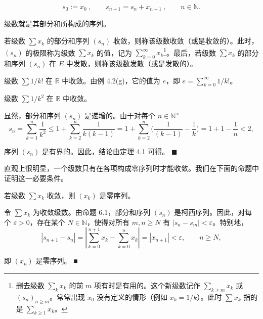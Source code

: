 \[
s_{0}:=x_{0}~,\qquad s_{n+1}=s_{n}+x_{n+1}~,\qquad n\in\mathbb{N}.
\]

级数就是其部分和所构成的序列。

若级数 $ \sum x_k $ 的部分和序列 $ (s_n) $ 收敛，则称该级数收敛（或是收敛的）。此时，$ (s_n) $ 的极限称为级数 $ \sum x_k $ 的值，记为 $ \sum_{k=0}^{\infty} x_k $\footnote{删去级数 $\sum_k x_k$ 的前 $m$ 项有时是有用的。这个新级数记作 $\sum_{k\geq m} x_k$ 或 $(s_n)_{n\geq m}$。常常出现 $x_0$ 没有定义的情形（例如 $x_k=1/k$）。此时 $\sum x_k$ 指的是 $\sum_{k\geq 1} x_k$。}。最后，若级数 $ \sum x_k $ 的部分和序列 $ (s_n) $ 在 $ E $ 中发散，则称该级数发散（或是发散的）。

\begin{example}

\begin{items}
\item

级数 $ \sum 1/k! $ 在 $ \mathbb{R} $ 中收敛。由例 4.2(g)，它的值为 $ e $，即 $ e = \sum_{k=0}^{\infty} 1/k! $。

\item

级数 $ \sum 1/k^2 $ 在 $ \mathbb{R} $ 中收敛。

\proofhead
显然，部分和序列 $ (s_n) $ 是递增的。由于对每个 $ n \in \mathbb{N}^\times $
\[
s_{n}=\sum_{k=1}^{n}\frac{1}{k^{2}}\leq1+\sum_{k=2}^{n}\frac{1}{k(k-1)}=1+\sum_{k=2}^{n}\Big(\frac{1}{(k-1)}-\frac{1}{k}\Big)=1+1-\frac{1}{n}<2,
\]

序列 $ (s_{n}) $ 是有界的。因此，结论由定理 4.1 可得。 $ \blacksquare $

\end{items}

直观上很明显，一个级数只有在各项构成零序列时才能收敛。我们在下面的命题中证明这一必要条件。

\end{example}

\begin{proposition}

若级数 $ \sum x_k $ 收敛，则 $ (x_k) $ 是零序列。

\proofhead
令 $ \sum x_k $ 为收敛级数。由命题 6.1，部分和序列 $ (s_n) $ 是柯西序列。因此，对每个 $ \varepsilon > 0 $，存在某个 $ N \in \mathbb{N} $，使得对所有 $ m, n \geq N $ 有 $ |s_n - s_m| < \varepsilon $。特别地，
\[
\left|s_{n+1}-s_{n}\right|=\left|\sum_{k=0}^{n+1}x_{k}-\sum_{k=0}^{n}x_{k}\right|=\left|x_{n+1}\right|<\varepsilon,\qquad n\geq N,
\]

即 $ (x_{n}) $ 是零序列。 ■

\end{proposition}


